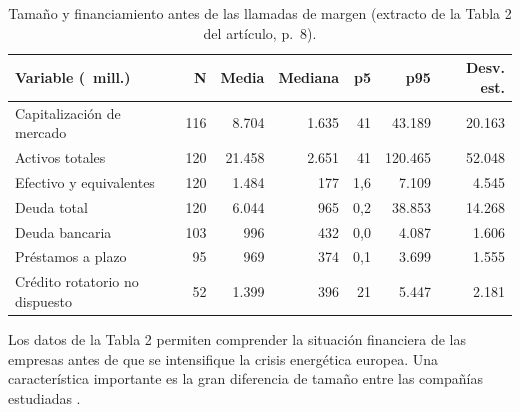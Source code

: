 \documentclass{article} %
\newcommand{\eur}{\texteuro}
\begin{document}
    \begin{table}[h]
        \centering\small
        \begin{tabular}{lrrrrrr}
        \toprule
        Variable (\eur\ mill.) & N & Media & Mediana & p5 & p95 & Desv. est. \\
        \midrule
        Capitalización de mercado & 116 & 8.704 & 1.635 & 41 & 43.189 & 20.163 \\
        Activos totales & 120 & 21.458 & 2.651 & 41 & 120.465 & 52.048 \\
        Efectivo y equivalentes & 120 & 1.484 & 177 & 1,6 & 7.109 & 4.545 \\
        Deuda total & 120 & 6.044 & 965 & 0,2 & 38.853 & 14.268 \\
        Deuda bancaria & 103 & 996 & 432 & 0,0 & 4.087 & 1.606 \\
        Préstamos a plazo & 95 & 969 & 374 & 0,1 & 3.699 & 1.555 \\
        Crédito rotatorio no dispuesto & 52 & 1.399 & 396 & 21 & 5.447 & 2.181 \\
        \bottomrule
        \end{tabular}
        \caption{Tamaño y financiamiento antes de las llamadas de margen (extracto de la Tabla 2 del artículo, p.~8).}
    \end{table}

    Los datos de la Tabla 2 permiten comprender la situación financiera de las empresas antes de que se intensifique la crisis energética europea. Una característica importante es la gran diferencia de tamaño entre las compañías estudiadas
    \parencite{GIANNOZZI2026107700}.

\end{document}
